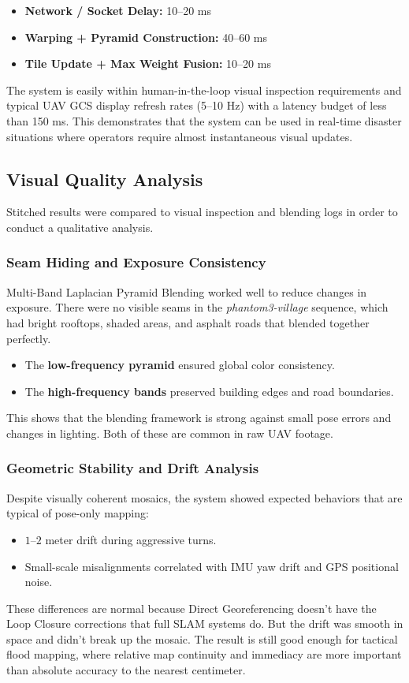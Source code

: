 \documentclass[conference]{IEEEtran}
\begin{document}
\begin{itemize}
    \item \textbf{Network / Socket Delay:} 10--20 ms
    \item \textbf{Warping + Pyramid Construction:} 40--60 ms
    \item \textbf{Tile Update + Max Weight Fusion:} 10--20 ms
\end{itemize}

The system is easily within human-in-the-loop visual inspection requirements and typical UAV GCS display refresh rates (5–10 Hz) with a latency budget of less than 150 ms. This demonstrates that the system can be used in real-time disaster situations where operators require almost instantaneous visual updates.

\subsection{Visual Quality Analysis}
Stitched results were compared to visual inspection and blending logs in order to conduct a qualitative analysis.

\subsubsection{Seam Hiding and Exposure Consistency}
Multi-Band Laplacian Pyramid Blending worked well to reduce changes in exposure. There were no visible seams in the \textit{phantom3-village} sequence, which had bright rooftops, shaded areas, and asphalt roads that blended together perfectly.
\begin{itemize}
    \item The \textbf{low-frequency pyramid} ensured global color consistency.
    \item The \textbf{high-frequency bands} preserved building edges and road boundaries.
\end{itemize}
This shows that the blending framework is strong against small pose errors and changes in lighting. Both of these are common in raw UAV footage.

\subsubsection{Geometric Stability and Drift Analysis}
Despite visually coherent mosaics, the system showed expected behaviors that are typical of pose-only mapping:
\begin{itemize}
    \item $1$--$2$ meter drift during aggressive turns.
    \item Small-scale misalignments correlated with IMU yaw drift and GPS positional noise.
\end{itemize}
These differences are normal because Direct Georeferencing doesn't have the Loop Closure corrections that full SLAM systems do. But the drift was smooth in space and didn't break up the mosaic. The result is still good enough for tactical flood mapping, where relative map continuity and immediacy are more important than absolute accuracy to the nearest centimeter.
\end{document}
